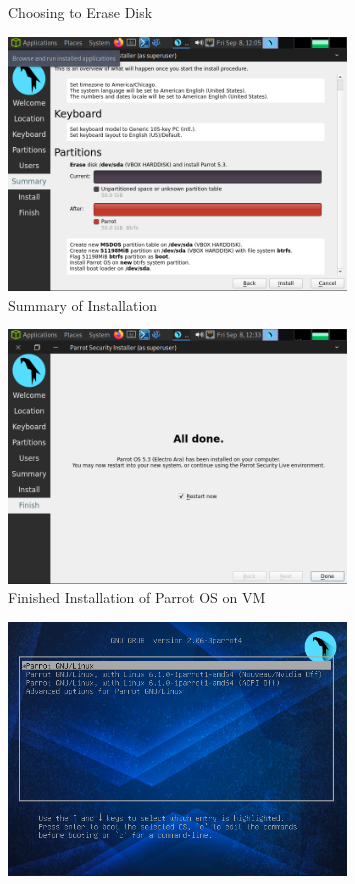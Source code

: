 \documentclass[12pt]{article}
\newenvironment{problem}[2][Problem]{\begin{trivlist}
\item[\hskip \labelsep {\bfseries #1}\hskip \labelsep {\bfseries #2.}]}{\end{trivlist}}
\begin{document}
\begin{problem}{1}
\begin{figure}[H]
        \caption{Choosing to Erase Disk}
    \end{figure}
    \begin{figure}[H]
        \centering
        \includegraphics[width=0.8\textwidth]{parrot_install5}
        \caption{Summary of Installation}
    \end{figure}
    \begin{figure}[H]
        \centering
        \includegraphics[width=0.8\textwidth]{parrot_install6}
        \caption{Finished Installation of Parrot OS on VM}
    \end{figure}
    \begin{figure}[H]
        \centering
        \includegraphics[width=0.8\textwidth]{parrot1}

\end{figure}
\end{problem}
\end{document}
